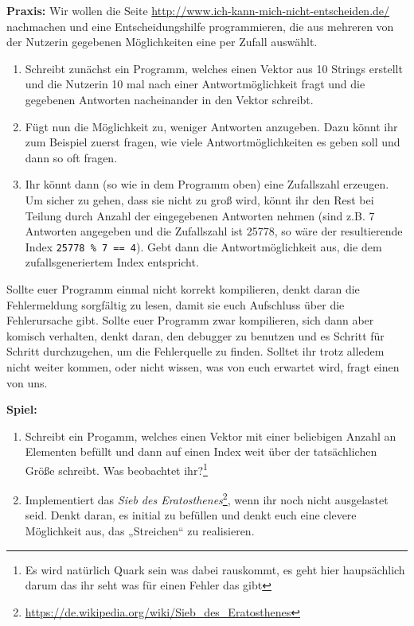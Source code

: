 \textbf{Praxis:}
Wir wollen die Seite \url{http://www.ich-kann-mich-nicht-entscheiden.de/} nachmachen und eine Entscheidungshilfe programmieren, die aus mehreren von der Nutzerin gegebenen Möglichkeiten eine per Zufall auswählt.

\begin{enumerate}
	\item
		Schreibt zunächst ein Programm, welches einen Vektor aus 10 Strings erstellt und die Nutzerin 10 mal nach einer Antwortmöglichkeit fragt und die gegebenen Antworten nacheinander in den Vektor schreibt.
	\item
		Fügt nun die Möglichkeit zu, weniger Antworten anzugeben.
		Dazu könnt ihr zum Beispiel zuerst fragen, wie viele Antwortmöglichkeiten es geben soll und dann so oft fragen.
	\item
		Ihr könnt dann (so wie in dem Programm oben) eine Zufallszahl erzeugen.
		Um sicher zu gehen, dass sie nicht zu groß wird, könnt ihr den Rest bei Teilung durch Anzahl der eingegebenen Antworten nehmen (sind z.B. 7 Antworten angegeben und die Zufallszahl ist 25778, so wäre der resultierende Index \texttt{25778 \% 7 == 4}).
		Gebt dann die Antwortmöglichkeit aus, die dem zufallsgeneriertem Index entspricht.
\end{enumerate}

Sollte euer Programm einmal nicht korrekt kompilieren, denkt daran die Fehlermeldung sorgfältig zu lesen, damit sie euch Aufschluss über die Fehlerursache gibt.
Sollte euer Programm zwar kompilieren, sich dann aber komisch verhalten, denkt daran, den debugger zu benutzen und es Schritt für Schritt durchzugehen, um die Fehlerquelle zu finden. Solltet ihr trotz alledem nicht weiter kommen, oder nicht wissen, was von euch erwartet wird, fragt einen
von uns.

\textbf{Spiel:}
\begin{enumerate}
	\item
		Schreibt ein Progamm, welches einen Vektor mit einer beliebigen Anzahl an Elementen befüllt und dann auf einen Index weit über der tatsächlichen Größe schreibt.
		Was beobachtet ihr?\footnote{Es wird natürlich Quark sein was dabei rauskommt, es geht hier haupsächlich darum das ihr seht was für einen Fehler das gibt}
	\item
		Implementiert das \emph{Sieb des Eratosthenes}\footnote{\url{https://de.wikipedia.org/wiki/Sieb_des_Eratosthenes}}, wenn ihr noch nicht ausgelastet seid.
		Denkt daran, es initial zu befüllen und denkt euch eine clevere Möglichkeit aus, das „Streichen“ zu realisieren.
\end{enumerate}

